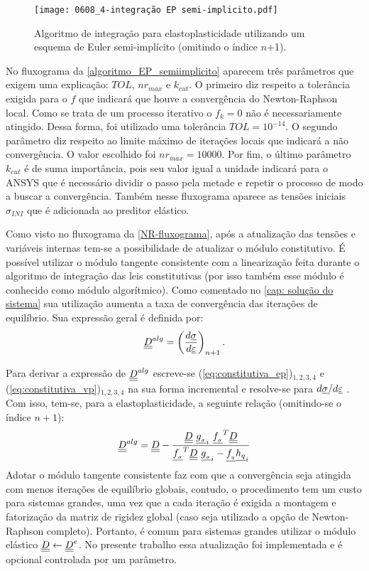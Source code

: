 \begin{figure}[H]
	\begin{center}
		\texttt{[image: 0608\_4-integração EP semi-implicito.pdf]}
	\end{center}
	\caption{\label{algoritmo_EP_semiimplicito}Algoritmo de integração para elastoplasticidade utilizando um esquema de Euler semi-implícito (omitindo o índice $n$+1).}
\end{figure}
No fluxograma da \autoref{algoritmo_EP_semiimplicito} aparecem três parâmetros que exigem uma explicação: $TOL$, $nr_{max}$ e $k_{cut}$. O primeiro diz respeito a tolerância exigida para o $f$ que indicará que houve a convergência do Newton-Raphson local. Como se trata de um processo iterativo o $f_k=0$ não é necessariamente atingido. Dessa forma, foi utilizado uma tolerância $TOL = 10^{-14}$. O segundo parâmetro diz respeito ao limite máximo de iterações locais que indicará a não convergência. O valor escolhido foi $nr_{max} = 10000$. Por fim, o último parâmetro $k_{cut}$ é de suma importância, pois seu valor igual a unidade indicará para o ANSYS que é necessário dividir o passo pela metade e repetir o processo de modo a buscar a convergência. Também nesse fluxograma aparece as tensões iniciais $\sigma_{INI}$ que é adicionada ao preditor elástico.

Como visto no fluxograma da \autoref{NR-fluxograma}, após a atualização das tensões e variáveis internas tem-se a possibilidade de atualizar o módulo constitutivo. É possível utilizar o módulo tangente consistente com a linearização feita durante o algoritmo de integração das leis constitutivas (por isso também esse módulo é conhecido como módulo algorítmico). Como comentado no \autoref{cap: solução do sistema} sua utilização aumenta a taxa de convergência das iterações de equilíbrio. Sua expressão geral é definida por:
\begin{equation}
	\label{eq:D_alg1}
	\underline{\underline D}^{alg} = \left(\dfrac{d\underline \sigma}{d\underline{\varepsilon}} \right)_{n+1}.
\end{equation}

Para derivar a expressão de $\underline{\underline D}^{alg}$  escreve-se (\ref{eq:constitutiva_ep})$_{1,2,3,4}$ e (\ref{eq:constitutiva_vp})$_{1,2,3,4}$ na sua forma incremental e resolve-se para $d\underline \sigma/d\underline{\varepsilon}$  \cite[p. 285]{Belytschko2000}. Com isso, tem-se, para a elastoplasticidade, a seguinte relação (omitindo-se o índice $n+1$):
\begin{equation}
	\label{eq:D_alg_ep}
	\underline{\underline D}^{alg} = \underline{\underline D} - \dfrac{\underline{\underline D}~\underline{g_{_\sigma}}_i~\underline{f_{_\sigma}}^T \underline{\underline D}}{\underline{f_{_\sigma}}^T\underline{\underline D}~\underline{g_{_\sigma}}_i-\underline{f_{_q}} \underline{h_q}_i}
\end{equation}
Adotar o módulo tangente consistente faz com que a convergência seja atingida com menos iterações de equilíbrio globais, contudo, o procedimento tem um custo para sistemas grandes, uma vez que a cada iteração é exigida a montagem e fatorização da matriz de rigidez global (caso seja utilizado a opção de Newton-Raphson completo).  Portanto, é comum para sistemas grandes utilizar o módulo elástico $\underline{\underline D} \leftarrow \underline{\underline D}^e$. No presente trabalho essa atualização foi implementada e é opcional controlada por um parâmetro.

